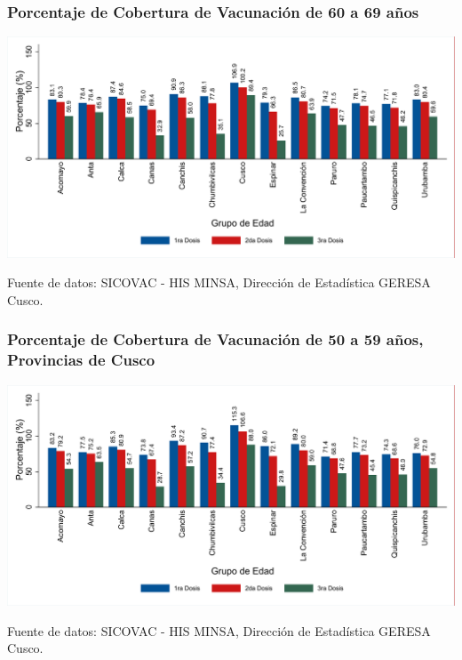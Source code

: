 \documentclass[xcolor=table]{beamer}
\begin{document}
\begin{frame}[label=vacunas_70]
	\frametitle{Porcentaje de Cobertura de Vacunación de 60 a 69 años}
	\vspace{-.5cm}
	\begin{center}
		\includegraphics[width=1.0\linewidth, trim={.2cm .5cm .2cm .2cm},clip]{../figuras/vacunacion_provincial_edad_practica_7.pdf}
	\end{center}
	{\tiny Fuente de datos: SICOVAC - HIS MINSA, Dirección de Estadística GERESA Cusco. \\}
\hyperlink{cobertura_vacuna_provincias}{}
\end{frame}

\begin{frame}[label=vacunas_60]
	\frametitle{Porcentaje de Cobertura de Vacunación de 50 a 59 años, Provincias de Cusco}
	\vspace{-.5cm}
	\begin{center}
		\includegraphics[width=1.0\linewidth, trim={.2cm .5cm .2cm .2cm},clip]{../figuras/vacunacion_provincial_edad_practica_6.pdf}
	\end{center}
	{\tiny Fuente de datos: SICOVAC - HIS MINSA, Dirección de Estadística GERESA Cusco. \\}
	\hyperlink{cobertura_vacuna_provincias}{}
\end{frame}
\end{document}
